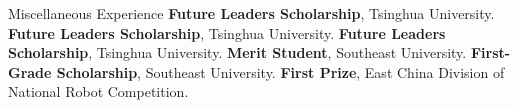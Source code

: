 \begin{rubric}{Miscellaneous Experience}  
\entry*[2025] \textbf{Future Leaders Scholarship}, Tsinghua University.  
%  
\entry*[2024] \textbf{Future Leaders Scholarship}, Tsinghua University.  
%  
\entry*[2023] \textbf{Future Leaders Scholarship}, Tsinghua University.  
%  
\entry*[2019] \textbf{Merit Student}, Southeast University.  
%  
\entry*[2018] \textbf{First-Grade Scholarship}, Southeast University.  
%  
\entry*[2017] \textbf{First Prize}, East China Division of National Robot Competition.  
\end{rubric}